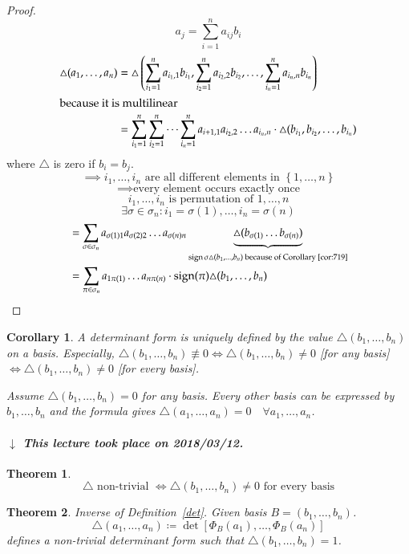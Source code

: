 \documentclass{article}
\newtheorem{theorem}{Theorem}  \numberwithin{theorem}{section}
\newtheorem{corollary}{Corollary}  \numberwithin{corollary}{section}
\newcommand{\set}[1]{\left\{#1\right\}}
\newcommand{\dateref}[1]{%
  \begin{mdframed}[backgroundcolor=gray!10,innerbottommargin=0pt,innertopmargin=0pt]
    \paragraph{\textit{$\downarrow$ This lecture took place on #1.}}%
  \end{mdframed}%
}
\DeclareMathOperator{\sign}{sign}
\begin{document}
\begin{proof}
  \[ a_j = \sum_{i=1}^n a_{ij} b_i \]
  \begin{align*}
    \triangle(a_1, \dots, a_n) &= \triangle\left(\sum_{i_1 = 1}^n a_{i_1,1} b_{i_1}, \sum_{i_2 = 1}^n a_{i_2,2} b_{i_2}, \dots, \sum_{i_n = 1}^n a_{i_n, n} b_{i_n}\right) \\
    \intertext{because it is multilinear}
      &= \sum_{i_1 = 1}^n \sum_{i_2=1}^n \dots \sum_{i_n=1}^n a_{i+1,1} a_{i_2,2} \dots a_{i_n,n} \cdot \triangle(b_{i_1}, b_{i_2}, \dots, b_{i_n})
  \end{align*}
  where $\triangle$ is zero if $b_i = b_j$.
  \[ \implies i_1,\dots,i_n \text{ are all different elements in } \set{1,\dots,n} \]
  \[ \implies \text{every element occurs exactly once} \]
  \[ i_1,\dots,i_n \text{ is permutation of } 1,\dots,n \]
  \[ \exists \sigma \in \sigma_n: i_1 = \sigma(1), \dots, i_n = \sigma(n) \]
  \begin{align*}
    &= \sum_{\sigma \in \sigma_n} a_{\sigma(1) 1} a_{\sigma(2) 2} \dots a_{\sigma(n) n} \underbrace{\triangle(b_{\sigma(1)} \dots b_{\sigma(n)})}_{\sign\sigma \triangle(b_1, \dots, b_n) \text{ because of Corollary~\ref{cor:719}}} \\
    &= \sum_{\pi \in \sigma_n} a_{1 \pi(1)} \dots a_{n \pi(n)} \cdot \sign(\pi) \triangle(b_1, \dots, b_n)
  \end{align*}
\end{proof}

\begin{corollary}
  A determinant form is uniquely defined by the value $\triangle(b_1, \dots, b_n)$ on a basis.
  Especially, $\triangle(b_1, \dots, b_n) \not\equiv 0 \iff \triangle(b_1,\dots,b_n) \neq 0$ [for any basis] $\iff \triangle(b_1,\dots,b_n) \neq 0$ [for every basis].

  Assume $\triangle(b_1,\dots,b_n) = 0$ for any basis.
  Every other basis can be expressed by $b_1, \dots ,b_n$ and the formula gives $\triangle(a_1, \dots, a_n) = 0 \quad \forall a_1,\dots,a_n$.
\end{corollary}

\dateref{2018/03/12}

\begin{theorem} %
  \[ \triangle \text{ non-trivial } \iff \triangle(b_1, \dots, b_n) \neq 0 \text{ for every basis} \]
\end{theorem}

\begin{theorem} %
  \label{theorem722}
  Inverse of Definition~\ref{det}. %
  Given basis $B = (b_1, \dots, b_n)$.
  \[ \triangle(a_1, \dots, a_n) \coloneqq \det\left[\Phi_B(a_1), \dots, \Phi_B(a_n)\right] \]
  defines a non-trivial determinant form such that $\triangle(b_1, \dots, b_n) = 1$.
\end{theorem}
\end{document}
